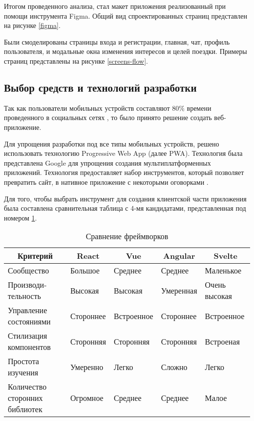 Итогом проведенного анализа, стал макет приложения реализованный при помощи инструмента Figma. Общий вид спроектированных страниц представлен на рисунке \ref{figma}.


Были смоделированы страницы входа и регистрации, главная, чат, профиль пользователя, и модальные окна изменения интересов и целей поездки. Примеры страниц представлены на рисунке \ref{screens-flow}.


\subsection{Выбор средств и технологий разработки}

Так как пользователи мобильных устройств составляют 80\% времени проведенного в социальных сетях \cite{mobile-vs-desktop-usage}, то было принято решение создать веб-приложение.

Для упрощения разработки под все типы мобильных устройств, решено использовать технологию Progressive Web App (далее PWA). Технология была представлена Google для упрощения создания мультиплатформенных приложений. Технология предоставляет набор инструментов, который позволяет превратить сайт, в нативное приложение с некоторыми оговорками \cite{what-are-pwas}.

Для того, чтобы выбрать инструмент для создания клиентской части приложения была составлена сравнительная таблица с 4-мя кандидатами, представленная под номером \ref{svelte-vs-others}.

\begin{table}[H]
    \raggedright
    \caption{Сравнение фреймворков}\label{svelte-vs-others}
    \begin{tabularx}{\textwidth}{|X|X|X|X|X|}
        \hline
        \multicolumn{1}{|c|}{Критерий} & \multicolumn{1}{c|}{React} & \multicolumn{1}{c|}{Vue} & \multicolumn{1}{c|}{Angular} & \multicolumn{1}{c|}{Svelte}\\ \hline
        Сообщество                     & Большое   & Среднее    & Среднее   & Маленькое     \\
        \hline
        Производи-тельность             & Высокая   & Высокая    & Умеренная & Очень высокая \\
        \hline
        Управление состояниями         & Стороннее & Встроенное & Стороннее & Встроенное    \\
        \hline
        Стилизация компонентов         & Сторонняя & Сторонняя  & Сторонняя & Встроеная     \\
        \hline
        Простота изучения              & Умеренно  & Легко      & Сложно    & Легко         \\
        \hline
        Количество сторонних библиотек & Огромное  & Среднее    & Среднее   & Малое \\ \hline
    \end{tabularx}
\end{table}

